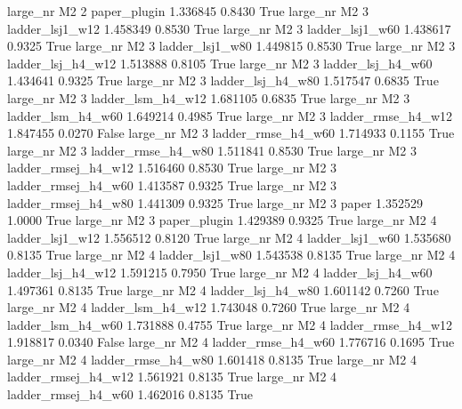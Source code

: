   large_nr       M2                 2        paper_plugin   1.336845      0.8430    True
  large_nr       M2                 3     ladder_lsj1_w12   1.458349      0.8530    True
  large_nr       M2                 3     ladder_lsj1_w60   1.438617      0.9325    True
  large_nr       M2                 3     ladder_lsj1_w80   1.449815      0.8530    True
  large_nr       M2                 3   ladder_lsj_h4_w12   1.513888      0.8105    True
  large_nr       M2                 3   ladder_lsj_h4_w60   1.434641      0.9325    True
  large_nr       M2                 3   ladder_lsj_h4_w80   1.517547      0.6835    True
  large_nr       M2                 3   ladder_lsm_h4_w12   1.681105      0.6835    True
  large_nr       M2                 3   ladder_lsm_h4_w60   1.649214      0.4985    True
  large_nr       M2                 3  ladder_rmse_h4_w12   1.847455      0.0270   False
  large_nr       M2                 3  ladder_rmse_h4_w60   1.714933      0.1155    True
  large_nr       M2                 3  ladder_rmse_h4_w80   1.511841      0.8530    True
  large_nr       M2                 3 ladder_rmsej_h4_w12   1.516460      0.8530    True
  large_nr       M2                 3 ladder_rmsej_h4_w60   1.413587      0.9325    True
  large_nr       M2                 3 ladder_rmsej_h4_w80   1.441309      0.9325    True
  large_nr       M2                 3               paper   1.352529      1.0000    True
  large_nr       M2                 3        paper_plugin   1.429389      0.9325    True
  large_nr       M2                 4     ladder_lsj1_w12   1.556512      0.8120    True
  large_nr       M2                 4     ladder_lsj1_w60   1.535680      0.8135    True
  large_nr       M2                 4     ladder_lsj1_w80   1.543538      0.8135    True
  large_nr       M2                 4   ladder_lsj_h4_w12   1.591215      0.7950    True
  large_nr       M2                 4   ladder_lsj_h4_w60   1.497361      0.8135    True
  large_nr       M2                 4   ladder_lsj_h4_w80   1.601142      0.7260    True
  large_nr       M2                 4   ladder_lsm_h4_w12   1.743048      0.7260    True
  large_nr       M2                 4   ladder_lsm_h4_w60   1.731888      0.4755    True
  large_nr       M2                 4  ladder_rmse_h4_w12   1.918817      0.0340   False
  large_nr       M2                 4  ladder_rmse_h4_w60   1.776716      0.1695    True
  large_nr       M2                 4  ladder_rmse_h4_w80   1.601418      0.8135    True
  large_nr       M2                 4 ladder_rmsej_h4_w12   1.561921      0.8135    True
  large_nr       M2                 4 ladder_rmsej_h4_w60   1.462016      0.8135    True
